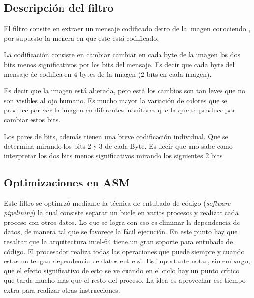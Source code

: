 \subsection{Descripción del filtro}

	El filtro consite en extraer un mensaje codificado detro de la imagen conociendo
, por supuesto la menera en que este está codificado.

	La codificación consiste en cambiar cambiar en cada byte de la imagen los
dos bits menos significativos por los bits del mensaje. Es decir que cada
byte del mensaje de codifica en 4 bytes de la imagen (2 bits en cada imagen).

	Es decir que la imagen está alterada, pero está los cambios son tan leves
que no son visibles al ojo humano. Es mucho mayor la variación de colores que
se produce por ver la imagen en diferentes monitores que la que se produce
por cambiar estos bits.

	Los pares de bits, además tienen una breve codificación individual. Que
se determina mirando los bits 2 y 3 de cada Byte. Es decir que uno sabe
como interpretar los dos bits menos significativos mirando los siguientes
2 bits.

\subsection{Optimizaciones en ASM}

	Este filtro se optimizó mediante la técnica de entubado de código (\textit{software pipelining})
la cual consiste separar un bucle en varios procesos y realizar cada proceso con otros datos.
Lo que se logra con eso es eliminar la dependencia de datos, de manera tal que se favorece
la fácil ejecución. En este punto hay que resaltar que la arquitectura intel-64 tiene un
gran soporte para entubado de código. El procesador realiza todas las operaciones que puede
siempre y cuando estas no tengan dependencia de datos entre si.
	Es importante notar, sin embargo, que el efecto significativo de esto se ve
cuando en el ciclo hay un punto crítico que tarda mucho mas que el resto
del proceso. La idea es aprovechar ese tiempo extra para realizar otras
instrucciones.

